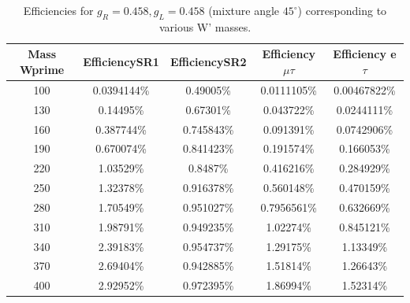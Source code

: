  \begin{table}[htb]
 	\centering
  	\begin{tabular}{|ccccc|}
  		\hline 
  		Mass Wprime & EfficiencySR1 & EfficiencySR2 & Efficiency $\mu$$\tau$ & Efficiency e $\tau$ \\
\hline 
  		100&0.0394144\%& 0.49005\%&0.0111105\%&0.00467822\%\\
        	130& 0.14495\%& 0.67301\%& 0.043722\%& 0.0244111\%\\
        	160& 0.387744\%&0.745843\%&0.091391\%&0.0742906\%\\
          	190& 0.670074\%& 0.841423\%& 0.191574\%& 0.166053\%\\
                220&1.03529\%&0.8487\%&0.416216\%&0.284929\%\\
                250&1.32378\%& 0.916378\%&0.560148\%&0.470159\%\\ 
          	280& 1.70549\%& 0.951027\%& 0.7956561\%& 0.632669\%\\
                310&1.98791\%&0.949235\%&1.02274\%&0.845121\%\\
                340& 2.39183\%& 0.954737\%& 1.29175\%& 1.13349\%\\ 
                370& 2.69404\%& 0.942885\%& 1.51814\%& 1.26643\%\\
        	400& 2.92952\%&0.972395\%&1.86994\%&1.52314\%\\

  		\hline
  	\end{tabular}
  	\caption{Efficiencies for $g_R=0.458,g_L=0.458$ (mixture angle $45^\circ$) corresponding to various W' masses. \label{eff-mix45} }
  \end{table}




